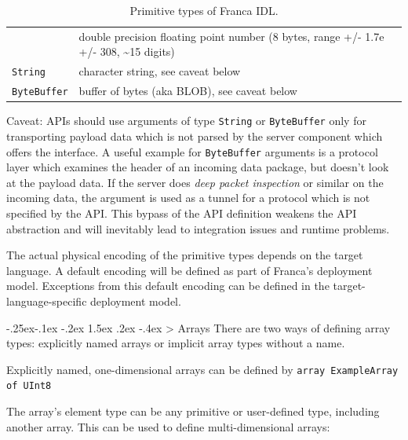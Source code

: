 \documentclass[a4paper,10pt]{scrreprt}
\makeatletter
\renewcommand\subsection{\medskip\@startsection{subsection}{2}{\z@}%
  {-.25ex\@plus -.1ex \@minus -.2ex}%
  {1.5ex \@plus .2ex \@minus -.4ex}%
  {\ifnum \scr@compatibility>\@nameuse{scr@v@2.96}\relax
    \setlength{\parfillskip}{\z@ plus 1fil}\fi
    \raggedsection\normalfont\sectfont\nobreak\size@subsection
  }%
}
\newlength{\XdocTEffectiveWidth}
\makeatother
\begin{document}
\begin{table}
\begin{tabular}{p{0.13\XdocTEffectiveWidth}p{0.88\XdocTEffectiveWidth}}
 & double precision floating point number (8 bytes, range +/- 1.7e +/- 308, \textasciitilde{}15 digits)

\\
\protect\lstinline[language=Franca]�String�

 & character string, see caveat below

\\
\protect\lstinline[language=Franca]�ByteBuffer�

 & buffer of bytes (aka BLOB), see caveat below

\\
\bottomrule
\end{tabular}
\caption{Primitive types of Franca IDL.}
\label{PrimitiveTypes}
\end{table}

Caveat: APIs should use arguments of type \protect\lstinline[language=Franca]{String} or
\protect\lstinline[language=Franca]{ByteBuffer} only for transporting payload data which is
not parsed by the server component which offers the interface.
A useful example for \protect\lstinline[language=Franca]{ByteBuffer} arguments is a 
protocol layer which examines the header of an incoming data
package, but doesn't look at the payload data.
If the server does \textit{deep packet inspection} or similar on the
incoming data, the argument is used as a tunnel for a protocol
which is not specified by the API. This bypass of the API definition
weakens the API abstraction and will inevitably lead to integration
issues and runtime problems.

The actual physical encoding of the primitive types depends on the target language.
A default encoding will be defined as part of Franca's deployment model. 
Exceptions from this default encoding can be defined in the target-language-specific
deployment model.

\subsection{Arrays}
\label{FIDL_Types_Array}
There are two ways of defining array types: explicitly named arrays or implicit
array types without a name.

Explicitly named, one-dimensional arrays can be defined by 
\protect\lstinline[language=Franca]{array ExampleArray of UInt8} 

The array's element type can be any primitive or user-defined type, including another array.
This can be used to define multi-dimensional arrays:
\end{document}
